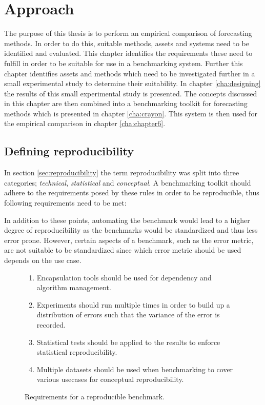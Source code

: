 \chapter{Approach}
\label{cha:approach}

The purpose of this thesis is to perform an empirical comparison of forecasting methods. In order to do this, suitable methods, assets and systems need to be identified and evaluated.
This chapter identifies the requirements these need to fulfill in order to be suitable for use in a benchmarking system. Further this chapter identifies assets and methods which need to be investigated further in a small experimental study to determine their suitability. In chapter \ref{cha:designing} the results of this small experimental study is presented. The concepts discussed in this chapter are then combined into a benchmarking toolkit for forecasting methods which is presented in chapter \ref{cha:crayon}. This system is then used for the empirical comparison in chapter \ref{cha:chapter6}.

\section{Defining reproducibility}
In section \ref{sec:reproducibility} the term reproducibility was split into three categories; \textit{technical}, \textit{statistical} and \textit{conceptual}. A benchmarking toolkit should adhere to the requirements posed by these rules in order to be reproducible, thus following requirements need to be met:

In addition to these points, automating the benchmark would lead to a higher degree of reproducibility as the benchmarks would be standardized and thus less error prone. However, certain aspects of a benchmark, such as the error metric, are not suitable to be standardized since which error metric should be used depends on the use case.

\begin{figure}[h]
    \begin{enumerate}
        \item Encapsulation tools should be used for dependency and algorithm management.
        \item Experiments should run multiple times in order to build up a distribution of errors such that the variance of the error is recorded.
        \item Statistical tests should be applied to the results to enforce statistical reproducibility.
        \item Multiple datasets should be used when benchmarking to cover various usecases for conceptual reproducibility.
    \end{enumerate}
    \caption{Requirements for a reproducible benchmark.}
    \label{fig:reproducibility_requirements}
\end{figure}

